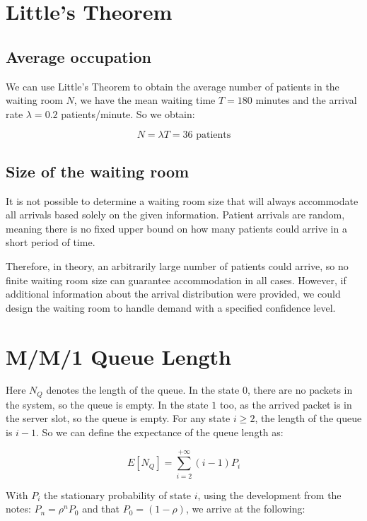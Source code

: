 \documentclass{article}
\begin{document}
\section{Little's Theorem}

\subsection{Average occupation}

We can use Little's Theorem to obtain the average number of patients in the waiting room $N$, we have the mean waiting time $T=180$ minutes and the arrival rate $\lambda = 0.2$ patients/minute. So we obtain:

\begin{equation}
  N = \lambda T = 36 \text{ patients}
\end{equation}

\subsection{Size of the waiting room}

It is not possible to determine a waiting room size that will always accommodate all arrivals based solely on the given information. Patient arrivals are random, meaning there is no fixed upper bound on how many patients could arrive in a short period of time.

Therefore, in theory, an arbitrarily large number of patients could arrive, so no finite waiting room size can guarantee accommodation in all cases.
However, if additional information about the arrival distribution were provided, we could design the waiting room to handle demand with a specified confidence level.

\section{M/M/1 Queue Length}

Here $N_Q$ denotes the length of the queue. In the state $0$, there are no packets in the system, so the queue is empty. In the state $1$ too, as the arrived packet is in the server slot, so the queue is empty. For any state $i\geq2$, the length of the queue is $i-1$. So we can define the expectance of the queue length as:

\begin{equation}
  E[N_Q]=\sum_{i=2}^{+\infty}(i-1)P_i
\end{equation}

With $P_i$ the stationary probability of state $i$, using the development from the notes: $P_n=\rho^n P_0$ and that $P_0= (1-\rho)$, we arrive at the following:
\end{document}
